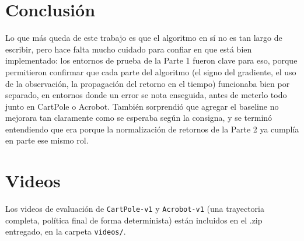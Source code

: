 \documentclass[10pt, a4paper, twocolumn]{article}
\begin{document}
\section{Conclusión}

Lo que más queda de este trabajo es que el algoritmo en sí no es tan largo de escribir, pero hace falta mucho cuidado para confiar en que está bien implementado: los entornos de prueba de la Parte 1 fueron clave para eso, porque permitieron confirmar que cada parte del algoritmo (el signo del gradiente, el uso de la observación, la propagación del retorno en el tiempo) funcionaba bien por separado, en entornos donde un error se nota enseguida, antes de meterlo todo junto en CartPole o Acrobot. También sorprendió que agregar el baseline no mejorara tan claramente como se esperaba según la consigna, y se terminó entendiendo que era porque la normalización de retornos de la Parte 2 ya cumplía en parte ese mismo rol.

\section{Videos}

Los videos de evaluación de \texttt{CartPole-v1} y \texttt{Acrobot-v1} (una trayectoria completa, política final de forma determinista) están incluidos en el .zip entregado, en la carpeta \texttt{videos/}. %
\end{document}

